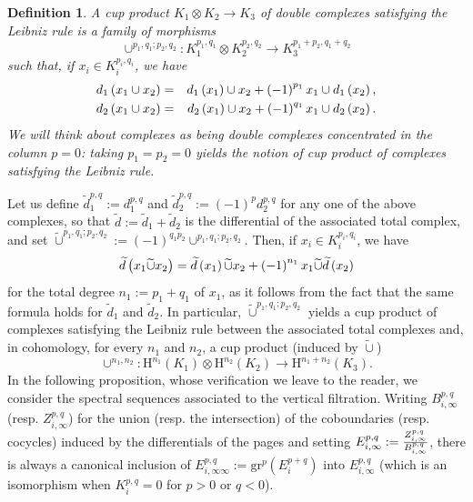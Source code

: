\documentclass[asterisque,english]{smfart}
\newtheorem{definition}{Definition}[]
\begin{document}
\begin{definition}\label{def:CupProd SS F DblCmpx3}
A cup product $K_{1}\otimes K_{2}\rightarrow K_{3}$ of double complexes 
satisfying the Leibniz rule is a family of morphisms
$$
\cup ^{p_{1},q_{1};p_{2},q_{2}}:K_{1}^{p_{1},q_{1}}\otimes
K_{2}^{p_{2},q_{2}}\rightarrow K_{3}^{p_{1}+p_{2},q_{1}+q_{2}}
$$
such that, if $x_{i}\in K_{i}^{p_{i},q_{i}}$, we have
\begin{eqnarray}
d_{1}\left( x_{1}\cup x_{2}\right) &=&d_{1}\left( x_{1}\right) \cup
x_{2}+\left( -1\right) ^{p_{1}}x_{1}\cup d_{1}\left( x_{2}\right),
\notag \\
d_{2}\left( x_{1}\cup x_{2}\right) &=&d_{2}\left( x_{1}\right) \cup
x_{2}+\left( -1\right) ^{q_{1}}x_{1}\cup d_{2}\left( x_{2}\right).
\end{eqnarray}
We will think about complexes as being double complexes concentrated in the
column $p=0$: taking $p_{1}=p_{2}=0$ yields the notion of cup product of
complexes satisfying the Leibniz rule.
\end{definition}

Let us define $\widetilde{d}_{1}^{p,q}:=d_{1}^{p,q}$ and $\widetilde{d}%
_{2}^{p,q}:=\left( -1\right) ^{p}d_{2}^{p,q}$ for any one of the above
complexes, so that $\widetilde{d}:=\widetilde{d}_{1}+\widetilde{d}_{2}$ is
the differential of the associated total complex, and set $\widetilde{\cup }%
^{p_{1},q_{1};p_{2},q_{2}}:=\left( -1\right) ^{q_{1}p_{2}}\cup
^{p_{1},q_{1};p_{2},q_{2}}$. Then, if $x_{i}\in K_{i}^{p_{i},q_{i}}$, we have%
\begin{equation*}
\widetilde{d}\left( x_{1}\widetilde{\cup }x_{2}\right) =\widetilde{d}\left(
x_{1}\right) \widetilde{\cup }x_{2}+\left( -1\right) ^{n_{1}}x_{1}\widetilde{%
\cup }\widetilde{d}\left( x_{2}\right) 
\end{equation*}%
for the total degree $n_{1}:=p_{1}+q_{1}$ of $x_{1}$, as it follows from the
fact that the same formula holds for $\widetilde{d}_{1}$ and $\widetilde{d}%
_{2}$. In particular, $\widetilde{\cup }^{p_{1},q_{1};p_{2},q_{2}}$ yields a
cup product of complexes satisfying the Leibniz rule between the associated
total complexes and, in cohomology, for every $n_{1}$ and $n_{2}$, a cup
product (induced by $\widetilde{\cup }$)%
\begin{equation*}
\cup ^{n_{1},n_{2}}\colon \mathrm{H}^{n_{1}}\left( K_{1}\right) \otimes 
\mathrm{H}^{n_{2}}\left( K_{2}\right) \longrightarrow \mathrm{H}%
^{n_{1}+n_{2}}\left( K_{3}\right) \text{.}
\end{equation*}%
In the following proposition, whose verification we leave to the reader, we
consider the spectral sequences associated to the vertical filtration.
Writing $B_{i,\infty }^{p,q}$ (resp. $Z_{i,\infty }^{p,q}$) for the union
(resp. the intersection) of the coboundaries (resp. cocycles) induced by the
differentials of the pages and setting $E_{i,\infty }^{p,q}:=\frac{%
Z_{i,\infty }^{p,q}}{B_{i,\infty }^{p,q}}$, there is always a canonical
inclusion of $E_{i,\infty \infty }^{p,q}:=\mathrm{gr}^{p}\left(
E_{i}^{p+q}\right) $ into $E_{i,\infty }^{p,q}$ (which is an isomorphism
when $K_{i}^{p,q}=0$ for $p>0$ or $q<0$).
\end{document}
